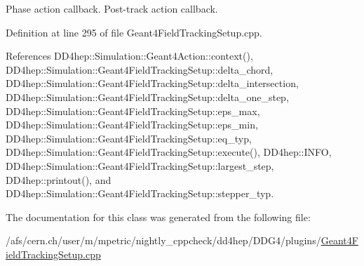 Phase action callback. Post-\/track action callback. 

Definition at line 295 of file Geant4FieldTrackingSetup.cpp.

References DD4hep::Simulation::Geant4Action::context(), DD4hep::Simulation::Geant4FieldTrackingSetup::delta\_\-chord, DD4hep::Simulation::Geant4FieldTrackingSetup::delta\_\-intersection, DD4hep::Simulation::Geant4FieldTrackingSetup::delta\_\-one\_\-step, DD4hep::Simulation::Geant4FieldTrackingSetup::eps\_\-max, DD4hep::Simulation::Geant4FieldTrackingSetup::eps\_\-min, DD4hep::Simulation::Geant4FieldTrackingSetup::eq\_\-typ, DD4hep::Simulation::Geant4FieldTrackingSetup::execute(), DD4hep::INFO, DD4hep::Simulation::Geant4FieldTrackingSetup::largest\_\-step, DD4hep::printout(), and DD4hep::Simulation::Geant4FieldTrackingSetup::stepper\_\-typ.

The documentation for this class was generated from the following file:\begin{DoxyCompactItemize}
\item 
/afs/cern.ch/user/m/mpetric/nightly\_\-cppcheck/dd4hep/DDG4/plugins/\hyperlink{_geant4_field_tracking_setup_8cpp}{Geant4FieldTrackingSetup.cpp}\end{DoxyCompactItemize}
